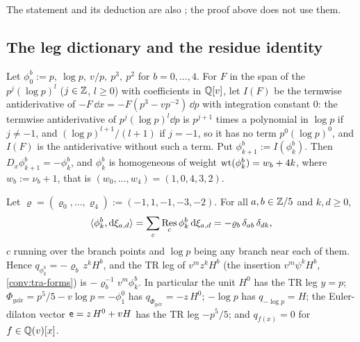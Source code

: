 The statement and its deduction are also \cite[Thm.~4.4 (4-23), Cor.~4.1 (4-26)--(4-29), App.~A (A-25)]{Eynard:2007kz}; the proof above does not use them.

\subsection{The leg dictionary and the residue identity}
\label{sec:mod-legs}

\begin{defn}
\label{def:mod-legs}
Let $\phi^b_0:=p,\ \log p,\ v/p,\ p^3,\ p^2$ for $b=0,\dots,4$. For $F$ in the span of the $p^j(\log p)^l$ ($j\in\mathbb{Z}$, $l\geq 0$) with coefficients in $\mathbb{Q}[v]$, let $I(F)$ be the termwise antiderivative of $-F\,\dd x=-F(p^3-vp^{-2})\,\dd p$ with integration constant $0$: the termwise antiderivative of $p^j(\log p)^l\dd p$ is $p^{j+1}$ times a polynomial in $\log p$ if $j\neq -1$, and $(\log p)^{l+1}/(l+1)$ if $j=-1$, so it has no term $p^0(\log p)^0$, and $I(F)$ is the antiderivative without such a term. Put $\phi^b_{k+1}:=I(\phi^b_k)$. Then $D_x\phi^b_{k+1}=-\phi^b_k$, and $\phi^b_k$ is homogeneous of weight $\operatorname{wt}(\phi^b_k)=w_b+4k$, where $w_b:=\nu_b+1$, that is $(w_0,\dots,w_4)=(1,0,4,3,2)$.
\end{defn}

\begin{prop}
\label{prop:mod-LD}
Let $\varrho=(\varrho_0,\dots,\varrho_4):=(-1,1,-1,-3,-2)$. For all $a,b\in\mathbb{Z}/5$ and $k,d\geq 0$,
\begin{equation}
\label{eq:mod-LD}
\langle\phi^b_k,\mathrm{d}\xi_{a,d}\rangle=\sum_c\operatorname*{Res}_{c}\phi^b_k\,\mathrm{d}\xi_{a,d}=-\varrho_b\,\delta_{ab}\,\delta_{dk},
\end{equation}
$c$ running over the branch points and $\log p$ being any branch near each of them. Hence $q_{\phi^b_k}=-\varrho_b\,z^kH^b$, and the TR leg of $v^mz^kH^b$ (the insertion $v^m\psi^kH^b$, \cref{conv:tra-forms}) is $-\varrho_b^{-1}v^m\phi^b_k$. In particular the unit $H^0$ has the TR leg $y=p$; $\Phi_{y\dd x}=p^5/5-v\log p=-\phi^0_1$ has $q_{\Phi_{y\dd x}}=-z\,H^0$; $-\log p$ has $q_{-\log p}=H$; the Euler-dilaton vector $\mathsf{e}=z\,H^0+vH$ has the TR leg $-p^5/5$; and $q_{f(x)}=0$ for $f\in\mathbb{Q}(v)[x]$.
\end{prop}

